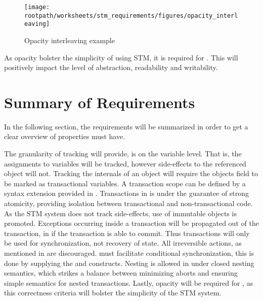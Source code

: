 \begin{figure}[htbp]
\centering
 \texttt{[image: \\rootpath/worksheets/stm\_requirements/figures/opacity\_interleaving]} 
 \caption{Opacity interleaving example}
\label{fig:opacity_interleaving}
\end{figure}

As opacity bolster the simplicity of using \ac{STM}, it is required for \stmname. This will positively impact the level of abstraction, readability and writability.

\section{Summary of Requirements}
In the following section, the requirements will be summarized in order to get a clear overview of properties \stmnamesp must have. 

The granularity of tracking \stmnamesp will provide, is on the variable level. That is, the assignments to variables will be tracked, however side-effects to the referenced object will not. Tracking the internals of an object will require the objects field to be marked as transactional variables. A transaction scope can be defined by a syntax extension provided in \stmname. Transactions in \stmnamesp is under the guarantee of strong atomicity, providing isolation between transactional and non-transactional code. As the \ac{STM} system does not track side-effects, use of immutable objects is promoted. Exceptions occurring inside a transaction will be propagated out of the transaction, in if the transaction is able to commit. Thus transactions will only be used for synchronization, not recovery of state. All irreversible actions, as mentioned in  are discouraged. \stmnamesp must facilitate conditional synchronization, this is done by supplying the  and  constructs. Nesting is allowed in \stmnamesp under closed nesting semantics, which strikes a balance between minimizing aborts and ensuring simple semantics for nested transactions. Lastly, opacity will be required for \stmnamesp, as this correctness criteria will bolster the simplicity of the \ac{STM} system.
\worksheetend